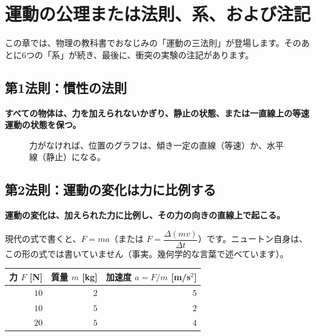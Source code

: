 \documentclass[a4paper,11pt,openany]{ltjsbook}
\begin{document}
\chapter{運動の公理または法則、系、および注記}

この章では、物理の教科書でおなじみの「運動の三法則」が登場します。そのあとに6つの「系」が続き、最後に、衝突の実験の注記があります。

\section{第1法則：慣性の法則}

\textbf{すべての物体は、力を加えられないかぎり、静止の状態、または一直線上の等速運動の状態を保つ。}

\begin{figure}[htbp]
\centering
{}
\caption{力がなければ、位置のグラフは、傾き一定の直線（等速）か、水平線（静止）になる。}
\end{figure}

\section{第2法則：運動の変化は力に比例する}

\textbf{運動の変化は、加えられた力に比例し、その力の向きの直線上で起こる。}

現代の式で書くと、$F=ma$（または $F=\dfrac{\Delta(mv)}{\Delta t}$）です。ニュートン自身は、この形の式では書いていません（事実。幾何学的な言葉で述べています）。

\begin{center}
\begin{tabular}{rrr}
\toprule
力 $F$ [N] & 質量 $m$ [kg] & 加速度 $a=F/m$ [m/s$^2$]\\
\midrule
$10$ & $2$ & $5$\\
$10$ & $5$ & $2$\\
$20$ & $5$ & $4$\\
\bottomrule
\end{tabular}
\end{center}
\end{document}
